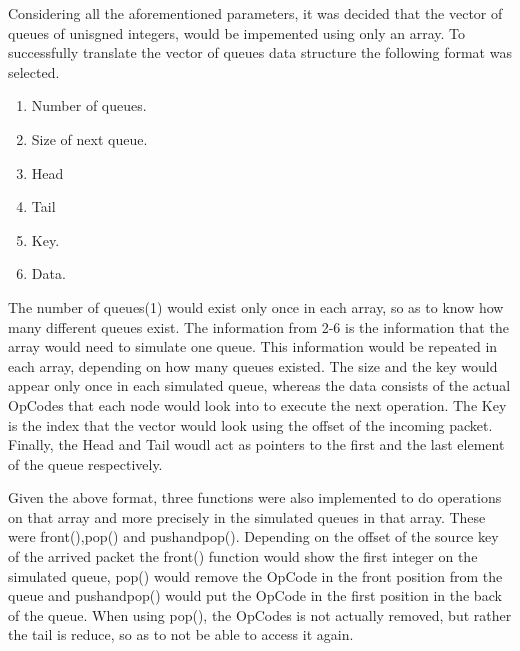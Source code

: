 \documentclass[12pt,a4paper]{article}
\begin{document}
Considering all the aforementioned parameters, it was decided that the vector of queues of unisgned integers, would be impemented using only an array. To successfully translate the vector of queues data structure the following format was selected.

\begin{enumerate}
\item Number of queues.
\item Size of next queue.
\item Head
\item Tail
\item Key.
\item Data.
\end{enumerate}
The number of queues(1) would exist only once in each array, so as to know how many different queues exist. The information from 2-6 is the information that the array would need to simulate one queue. This information would be repeated in each array, depending on how many queues existed. The size and the key would appear only once in each simulated queue, whereas the data consists of the actual OpCodes that each node would look into to execute the next operation. The Key is the index that the vector would look using the offset of the incoming packet. Finally, the Head and Tail woudl act as pointers to the first and the last element of the queue respectively.

Given the above format, three functions were also implemented to do operations on that array and more precisely in the simulated queues in that array. These were front(),pop() and pushandpop(). Depending on the offset of the source key of the arrived packet the front() function would show the first integer on the simulated queue, pop() would remove the OpCode in the front position from the queue and pushandpop() would put the OpCode in the first position in the back of the queue. When using pop(), the OpCodes is not actually removed, but rather the tail is reduce, so as to not be able to access it again.

\newpage


\cite{navaridas2009understanding}
\cite{sharp2012power}
\cite{davies2010interfacing}
\cite{sharp2011event}
\cite{gerstner2002spiking}
\cite{press2007numerical}
\cite{shewchuk1994introduction}
\cite{cgm2009lec}
\cite{o1987parallel}
\cite{adams1985m}
\cite{maheswaran1999mcgs}
\cite{yang2001improved}
\cite{adams1983m}
\cite{galiano2012gpu}
\cite{wozniak2010parallel}
\cite{hestenes1952methods}
\cite{rosenbloom1956method}
\cite{furber2007neural}
\cite{spinnweb}
\cite{khan2008spinnaker}
\cite{docfile}
\cite{plana2007gals}
\cite{furber2012overview}
\cite{bose2005spiking}
\cite{jefflec}
\cite{rast2012managing}
\end{document}
